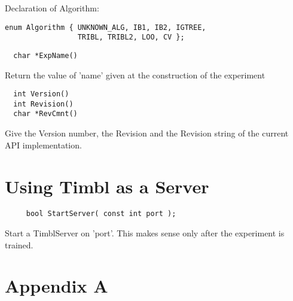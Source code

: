 \documentclass{article}
\begin{document}
Declaration of Algorithm:
\begin{verbatim}
enum Algorithm { UNKNOWN_ALG, IB1, IB2, IGTREE, 
                 TRIBL, TRIBL2, LOO, CV };
\end{verbatim}

\begin{verbatim}
  char *ExpName()
\end{verbatim}

Return the value of 'name' given at the construction of the experiment


\begin{verbatim}
  int Version()
  int Revision()
  char *RevCmnt()
\end{verbatim}

Give the Version number, the Revision and the Revision string of the
current API implementation.

\section{Using Timbl as a Server}

\begin{verbatim}
     bool StartServer( const int port );
\end{verbatim}

Start a TimblServer on 'port'. This makes sense only after the
experiment is trained.

\section{Appendix A}
\end{document}

